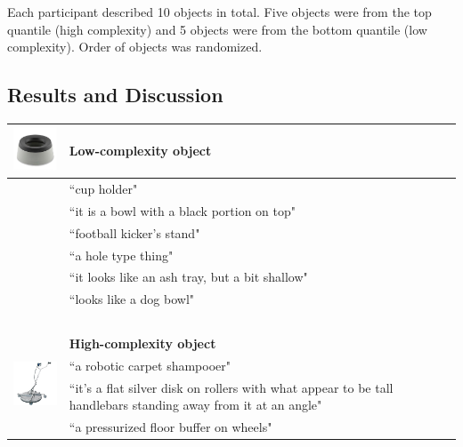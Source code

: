 Each participant described 10 objects in total. Five objects were from the top quantile (high complexity) and 5 objects were from the bottom quantile (low complexity). Order of objects was randomized.

\subsection{Results and Discussion}


\begin{table}[t!]
\centering

\begin{tabular}{ll}
\toprule
\multirow{6}{*}{\includegraphics[width=2cm]{figs/obj_29_p2.jpg}} & \textbf{Low-complexity object}                \\
\toprule
                   & ``cup holder"                                   \\
                   & ``it is a bowl with a black portion on top"      \\
                   & ``football kicker's stand"                      \\
                   & ``a hole type thing"                              \\
                   & ``it looks like an ash tray, but a bit shallow" \\
                   & ``looks like a dog bowl" \\
 \bottomrule
~ & ~ \\
  \toprule
\multirow{6}{*}{\includegraphics[width=1.8cm]{figs/obj_27_p2.jpg}} & \textbf{High-complexity object}               \\
\toprule
                   & ``a robotic carpet shampooer"                                   \\
                   & \multicolumn{1}{p{12cm}}{ ``it's a flat silver disk on rollers with what appear to be tall handlebars standing away from it at an angle"}                     \\
                   & ``a pressurized floor buffer on wheels"                                   \\

\end{tabular}
\end{table}
